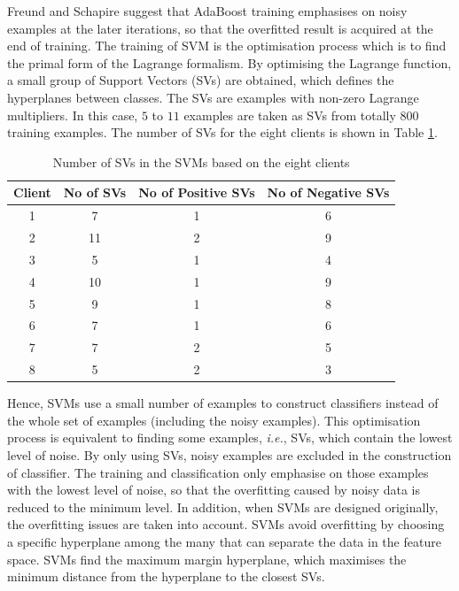 \documentclass[a4paper,10pt]{article}
\begin{document}
Freund and Schapire \cite{Freund1996} suggest that AdaBoost training emphasises on noisy examples at the later iterations, so that the overfitted result is acquired at the end of training. The training of SVM is the optimisation process which is to find the primal form of the Lagrange formalism. By optimising the Lagrange function, a small group of Support Vectors (SVs) are obtained, which defines the hyperplanes between classes. The SVs are examples with non-zero Lagrange multipliers. In this case, $5$ to $11$ examples are taken as SVs from totally $800$ training examples. The number of SVs for the eight clients is shown in \mbox{Table} \ref{tab:noSVs}. 
\begin{table}[ht]
\begin{center}
\caption{Number of SVs in the SVMs based on the eight clients}
 \begin{tabular}{|c|c|c|c|}
  \hline
  Client & No of SVs & No of Positive SVs & No of Negative SVs \\
  \hline
  1 & 7 & 1 & 6 \\
  2 & 11 & 2 & 9 \\
  3 & 5 & 1 & 4 \\
  4 & 10 & 1 & 9 \\
  5 & 9 & 1 & 8 \\
  6 & 7 & 1 & 6 \\
  7 & 7 & 2 & 5 \\
  8 & 5 & 2 & 3 \\
  \hline
 \end{tabular}
\label{tab:noSVs} 
\end{center}
\end{table}
Hence, SVMs use a small number of examples to construct classifiers instead of the whole set of examples (including the noisy examples). This optimisation process is equivalent to finding some examples, \textit{i.e.}, SVs, which contain the lowest level of noise. By only using SVs, noisy examples are excluded in the construction of classifier. The training and classification only emphasise on those examples with the lowest level of noise, so that the overfitting caused by noisy data is reduced to the minimum level. In addition, when SVMs are designed originally, the overfitting issues are taken into account. SVMs avoid overfitting by choosing a specific hyperplane among the many that can separate the data in the feature space. SVMs find the maximum margin hyperplane, which maximises the minimum distance from the hyperplane to the closest SVs.
\end{document}

